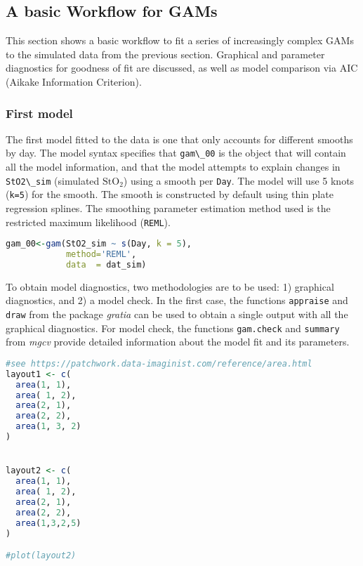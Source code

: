 \documentclass[
]{article}
\newcommand{\passthrough}[1]{#1}
\begin{document}
\hypertarget{a-basic-workflow-for-gams}{%
\subsection{A basic Workflow for GAMs}\label{a-basic-workflow-for-gams}}

This section shows a basic workflow to fit a series of increasingly complex GAMs to the simulated data from the previous section. Graphical and parameter diagnostics for goodness of fit are discussed, as well as model comparison via AIC (Aikake Information Criterion).

\hypertarget{first-model}{%
\subsubsection{First model}\label{first-model}}

The first model fitted to the data is one that only accounts for different smooths by day. The model syntax specifies that \passthrough{\lstinline!gam\_00!} is the object that will contain all the model information, and that the model attempts to explain changes in \passthrough{\lstinline!StO2\_sim!} (simulated \(\mbox{StO}_2\)) using a smooth per \passthrough{\lstinline!Day!}. The model will use 5 knots (\passthrough{\lstinline!k=5!}) for the smooth. The smooth is constructed by default using thin plate regression splines. The smoothing parameter estimation method used is the restricted maximum likelihood (\passthrough{\lstinline!REML!}).

\begin{lstlisting}[language=R]
gam_00<-gam(StO2_sim ~ s(Day, k = 5),
            method='REML',
            data  = dat_sim)
\end{lstlisting}

To obtain model diagnostics, two methodologies are to be used: 1) graphical diagnostics, and 2) a model check. In the first case, the functions \passthrough{\lstinline!appraise!} and \passthrough{\lstinline!draw!} from the package \emph{gratia} can be used to obtain a single output with all the graphical diagnostics. For model check, the functions \passthrough{\lstinline!gam.check!} and \passthrough{\lstinline!summary!} from \emph{mgcv} provide detailed information about the model fit and its parameters.



\begin{lstlisting}[language=R]
#see https://patchwork.data-imaginist.com/reference/area.html
layout1 <- c(
  area(1, 1),
  area( 1, 2),
  area(2, 1),
  area(2, 2),
  area(1, 3, 2)
)


layout2 <- c(
  area(1, 1),
  area( 1, 2),
  area(2, 1),
  area(2, 2),
  area(1,3,2,5)
)

#plot(layout2)
\end{lstlisting}
\end{document}

